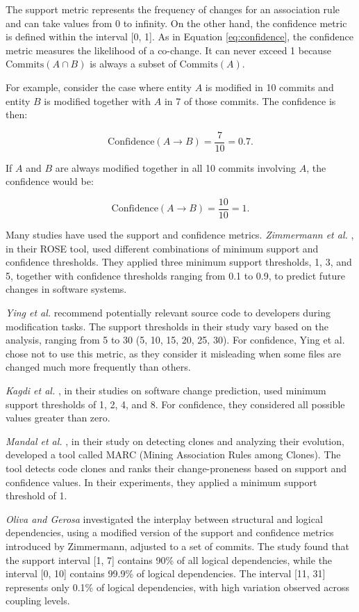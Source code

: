 The support metric represents the frequency of changes for an association rule and can take values from 0 to infinity. On the other hand, the confidence metric is defined within the interval [0, 1]. As in Equation \eqref{eq:confidence}, the confidence metric measures the likelihood of a co-change. It can never exceed 1 because $\text{Commits}(A \cap B)$ is always a subset of $\text{Commits}(A)$.


 For example, consider the case where entity $A$ is modified in 10 commits and entity $B$ is modified together with $A$ in 7 of those commits. The confidence is then:

\[
\text{Confidence}(A \rightarrow B) = \frac{7}{10} = 0.7.
\]

If $A$ and $B$ are always modified together in all 10 commits involving $A$, the confidence would be:

\[
\text{Confidence}(A \rightarrow B) = \frac{10}{10} = 1.
\]



Many studies have used the support and confidence metrics. \textit{Zimmermann et al.} \cite{Zimmermann:2004:MVH:998675.999460}, in their ROSE tool, used different combinations of minimum support and confidence thresholds. They applied three minimum support thresholds, 1, 3, and 5, together with confidence thresholds ranging from 0.1 to 0.9, to predict future changes in software systems.

\textit{Ying et al.} \cite{Ying-co-change} recommend potentially relevant source code to developers during modification tasks. The support thresholds in their study vary based on the analysis, ranging from 5 to 30 (5, 10, 15, 20, 25, 30). For confidence, Ying et al. chose not to use this metric, as they consider it misleading when some files are changed much more frequently than others.

\textit{Kagdi et al.} \cite{article-Kagdi-commit}, in their studies on software change prediction, used minimum support thresholds of 1, 2, 4, and 8. For confidence, they considered all possible values greater than zero.

\textit{Mandal et al.} \cite{Mandal-clones}, in their study on detecting clones and analyzing their evolution, developed a tool called MARC (Mining Association Rules among Clones). The tool detects code clones and ranks their change-proneness based on support and confidence values. In their experiments, they applied a minimum support threshold of 1.

\textit{Oliva and Gerosa} \cite{Oliva:2011:ISL:2067853.2068086, OlivaG152} investigated the interplay between structural and logical dependencies, using a modified version of the support and confidence metrics introduced by Zimmermann, adjusted to a set of commits. The study found that the support interval [1, 7] contains 90\% of all logical dependencies, while the interval [0, 10] contains 99.9\% of logical dependencies. The interval [11, 31] represents only 0.1\% of logical dependencies, with high variation observed across coupling levels.

